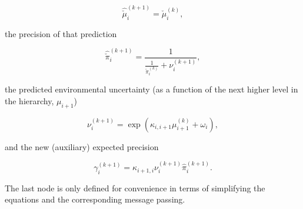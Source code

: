 \begin{equation}
	\hat{\check{\mu}}_i^{(k+1)} = \check{\mu}_i^{(k)},
\end{equation}

the precision of that prediction

\begin{equation}
  \hat{\check{\pi}}_i^{(k+1)} = \frac{1}{\frac{1}{\check{\pi}_i^{(k)}} + \nu_i^{(k+1)}}, 
\end{equation}

the predicted environmental uncertainty (as a function of the next higher level in the hierarchy, $\mu_{i+1}$)

\begin{equation}
  \nu_i^{(k+1)} = \exp(\kappa_{i,i+1} \mu_{i+1}^{(k)} + \omega_i),
\end{equation}

and the new (auxiliary) expected precision

\begin{equation}
  \gamma_i^{(k+1)} = \kappa_{i+1,i} \nu_i^{(k+1)} \hat{\pi}_i^{(k+1)}.
\end{equation}

The last node is only defined for convenience in terms of simplifying the equations and the corresponding message passing.